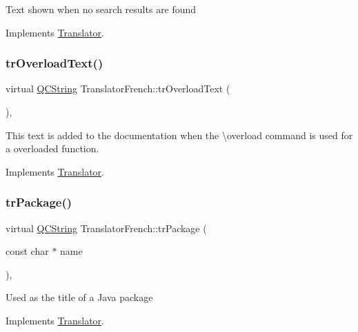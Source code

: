 Text shown when no search results are found 

Implements \mbox{\hyperlink{class_translator}{Translator}}.

\mbox{\label{class_translator_french_aca0a86de421a9eac7d1cf828cd252ea6}} 
\subsubsection{\texorpdfstring{trOverloadText()}{trOverloadText()}}
{\footnotesize\ttfamily virtual \mbox{\hyperlink{class_q_c_string}{Q\+C\+String}} Translator\+French\+::tr\+Overload\+Text (\begin{DoxyParamCaption}{ }\end{DoxyParamCaption})\hspace{0.3cm}{\ttfamily [inline]}, {\ttfamily [virtual]}}

This text is added to the documentation when the \textbackslash{}overload command is used for a overloaded function. 

Implements \mbox{\hyperlink{class_translator}{Translator}}.

\mbox{\label{class_translator_french_a0d8cc6494a2dfb4083952a930def2009}} 
\subsubsection{\texorpdfstring{trPackage()}{trPackage()}}
{\footnotesize\ttfamily virtual \mbox{\hyperlink{class_q_c_string}{Q\+C\+String}} Translator\+French\+::tr\+Package (\begin{DoxyParamCaption}\item[{const char $\ast$}]{name }\end{DoxyParamCaption})\hspace{0.3cm}{\ttfamily [inline]}, {\ttfamily [virtual]}}

Used as the title of a Java package 

Implements \mbox{\hyperlink{class_translator}{Translator}}.

\mbox{\label{class_translator_french_a3257a3b9144de0e7bed8400960f911ef}} 
